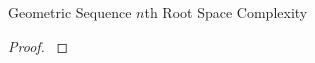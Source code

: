\begin{theorem}{Geometric Sequence $n$th Root Space Complexity}
\label{thm:geom-seq-nth-root-algo-space-complexity}

\end{theorem}

\begin{proof}
\label{prf:geom-seq-nth-root-algo-space-complexity}

\end{proof}
